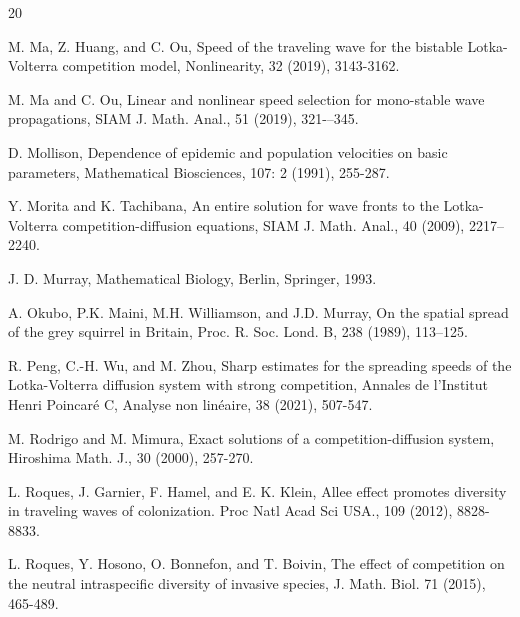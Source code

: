 \documentclass[11pt,a4paper]{article}
\numberwithin{equation}{section}
\numberwithin{figure}{section}
\begin{document}
\begin{thebibliography}{20}


{M. Ma, Z. Huang, and C. Ou},
Speed of the traveling wave for the bistable Lotka-Volterra competition model, Nonlinearity, 32 (2019), 3143-3162.


{M. Ma and C. Ou},
Linear and nonlinear speed selection for mono-stable wave propagations, SIAM J. Math. Anal., 51 (2019),
321-–345.

{D. Mollison},
Dependence of epidemic and population velocities on basic parameters,
Mathematical Biosciences,
107: 2 (1991), 255-287.

 {Y. Morita and K. Tachibana},
An entire solution for wave fronts to the Lotka-Volterra
competition-diffusion equations,
SIAM J. Math. Anal., 40 (2009), 2217--2240.


{J. D. Murray}, Mathematical Biology, Berlin, Springer, 1993.

{A. Okubo, P.K. Maini, M.H. Williamson, and J.D. Murray,}
On the spatial spread of the grey squirrel in Britain,
Proc. R. Soc. Lond. B, 238 (1989), 113--125.

{R. Peng, C.-H. Wu, and M. Zhou},
Sharp estimates for the spreading speeds of the Lotka-Volterra diffusion system with strong competition, Annales de l'Institut Henri Poincar\'e C, Analyse non lin\'eaire, 38 (2021), 507-547.



{M. Rodrigo and M. Mimura}, Exact solutions of a competition-diffusion system, Hiroshima Math. J., 30 (2000),
257-270.

{L. Roques, J. Garnier, F. Hamel, and E. K. Klein},
Allee effect promotes diversity in traveling waves of colonization. Proc Natl Acad Sci USA., 109 (2012), 8828-8833.

{L. Roques, Y. Hosono, O. Bonnefon, and T. Boivin}, The effect of competition on the neutral intraspecific diversity of invasive species, J. Math. Biol. 71 (2015), 465-489.



\end{thebibliography}
\end{document}
